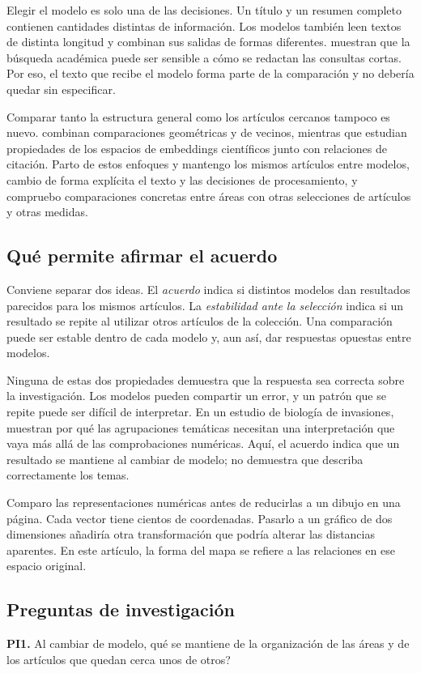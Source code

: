 \documentclass[12pt]{article}
\begin{document}
Elegir el modelo es solo una de las decisiones. Un título y un resumen completo contienen cantidades distintas de información. Los modelos también leen textos de distinta longitud y combinan sus salidas de formas diferentes. \citet{singh-singh-2022-inefficiency} muestran que la búsqueda académica puede ser sensible a cómo se redactan las consultas cortas. Por eso, el texto que recibe el modelo forma parte de la comparación y no debería quedar sin especificar.

Comparar tanto la estructura general como los artículos cercanos tampoco es nuevo. \citet{ref4e1e0d5582} combinan comparaciones geométricas y de vecinos, mientras que \citet{ref6da178065c} estudian propiedades de los espacios de embeddings científicos junto con relaciones de citación. Parto de estos enfoques y mantengo los mismos artículos entre modelos, cambio de forma explícita el texto y las decisiones de procesamiento, y compruebo comparaciones concretas entre áreas con otras selecciones de artículos y otras medidas.

\subsection{Qué permite afirmar el acuerdo}
Conviene separar dos ideas. El \emph{acuerdo} indica si distintos modelos dan resultados parecidos para los mismos artículos. La \emph{estabilidad ante la selección} indica si un resultado se repite al utilizar otros artículos de la colección. Una comparación puede ser estable dentro de cada modelo y, aun así, dar respuestas opuestas entre modelos.

Ninguna de estas dos propiedades demuestra que la respuesta sea correcta sobre la investigación. Los modelos pueden compartir un error, y un patrón que se repite puede ser difícil de interpretar. En un estudio de biología de invasiones, \citet{QSSreviewQ17} muestran por qué las agrupaciones temáticas necesitan una interpretación que vaya más allá de las comprobaciones numéricas. Aquí, el acuerdo indica que un resultado se mantiene al cambiar de modelo; no demuestra que describa correctamente los temas.

Comparo las representaciones numéricas antes de reducirlas a un dibujo en una página. Cada vector tiene cientos de coordenadas. Pasarlo a un gráfico de dos dimensiones añadiría otra transformación que podría alterar las distancias aparentes. En este artículo, la forma del mapa se refiere a las relaciones en ese espacio original.

\subsection{Preguntas de investigación}
\textbf{PI1.} Al cambiar de modelo, \textquestiondown{}qué se mantiene de la organización de las áreas y de los artículos que quedan cerca unos de otros?
\end{document}

